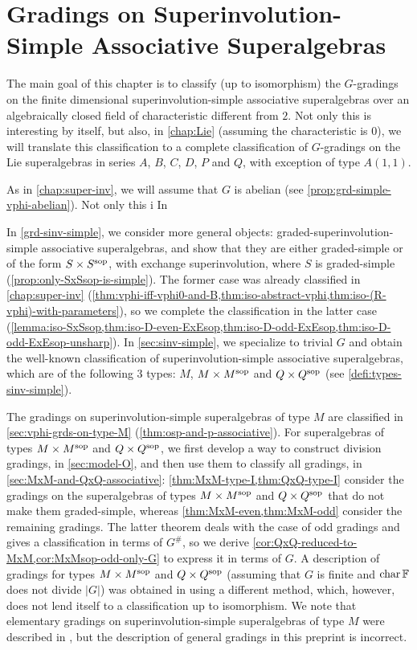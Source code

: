 \chapter[Gradings on Superinvolution-Simple Associative Superalgebras]
{Gradings on Superinvolution-\texorpdfstring{ }{}Simple Associative Superalgebras}\label{chap:grds-sinv-simple}

The main goal of this chapter is to classify (up to isomorphism) the $G$-gradings on the finite dimensional superinvolution-simple associative superalgebras over an algebraically closed field of characteristic different from $2$. 
Not only this is interesting by itself, but also, in \cref{chap:Lie} (assuming the characteristic is $0$), we will translate this classification to a complete classification of $G$-gradings on the Lie superalgebras in series $A$, $B$, $C$, $D$, $P$ and $Q$, with exception of type $A(1,1)$. 

As in \cref{chap:super-inv}, we will assume that $G$ is abelian (see \cref{prop:grd-simple-vphi-abelian}). 
Not only this i
In 

In \cref{grd-sinv-simple}, we consider more general objects: graded-superinvolution-simple associative superalgebras, and show that they are either graded-simple or of the form $S\times S^{\mathrm{sop}}$, with exchange superinvolution, where $S$ is graded-simple (\cref{prop:only-SxSsop-is-simple}). 
The former case was already classified in \cref{chap:super-inv} (\cref{thm:vphi-iff-vphi0-and-B,thm:iso-abstract-vphi,thm:iso-(R-vphi)-with-parameters}), so we complete the classification in the latter case (\cref{lemma:iso-SxSsop,thm:iso-D-even-ExEsop,thm:iso-D-odd-ExEsop,thm:iso-D-odd-ExEsop-unsharp}). 
In \cref{sec:sinv-simple}, we specialize to trivial $G$ and obtain the well-known classification of superinvolution-simple associative superalgebras, which are of the following $3$ types: $M$, $M\times M^{\mathrm{sop}}$ and $Q\times Q^{\mathrm{sop}}$ (see \cref{defi:types-sinv-simple}). 

The gradings on superinvolution-simple superalgebras of type $M$ are classified in \cref{sec:vphi-grds-on-type-M} (\cref{thm:osp-and-p-associative}). 
For superalgebras of types $M\times M^{\mathrm{sop}}$ and $Q\times Q^{\mathrm{sop}}$, we first develop a way to construct division gradings, in \cref{sec:model-O}, and then use them to classify all gradings, in \cref{sec:MxM-and-QxQ-associative}: 
\cref{thm:MxM-type-I,thm:QxQ-type-I} consider the gradings on the superalgebras of types $M\times M^{\mathrm{sop}}$ and $Q\times Q^{\mathrm{sop}}$ that do not make them graded-simple, whereas  
\cref{thm:MxM-even,thm:MxM-odd} consider the remaining gradings. 
The latter theorem deals with the case of odd gradings and gives a classification in terms of $G^\#$, so we derive
\cref{cor:QxQ-reduced-to-MxM,cor:MxMsop-odd-only-G} to express it in terms of $G$. 
A description of gradings for types $M\times M^{\mathrm{sop}}$ and $Q\times Q^{\mathrm{sop}}$ (assuming that $G$ is finite and $\operatorname{char} \mathbb{F}$ does not divide $|G|$) was obtained in \cite[Theorems 4 and 5]{BTT} using a different method, which, however, does not lend itself to a classification up to isomorphism. 
We note that elementary gradings on superinvolution-simple superalgebras of type $M$ were described in \cite[Theorems 5.2 and 5.3]{TT}, but the description of general gradings in this preprint is incorrect.  

